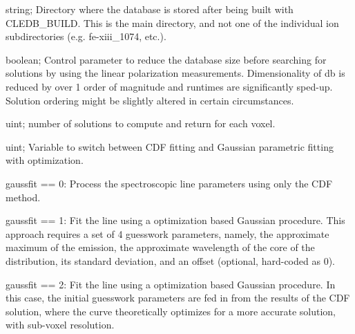 \documentclass{article}
\begin{document}
\begin{description}
    [font=\normalfont,leftmargin=1.3in,style=multiline]
	\item[dbdir]
	string; Directory where the database is stored after being built with CLEDB\_BUILD. This is the main directory, and not one of the individual ion subdirectories (e.g. fe-xiii\_1074, etc.).
	\item[reduced]
	boolean; Control parameter to reduce the database size before searching for solutions by using the linear polarization measurements. Dimensionality of db is reduced by over 1 order of magnitude and runtimes are significantly sped-up. Solution ordering might be slightly altered in certain circumstances.
	\item[nsearch]
	uint; number of solutions to compute and return for each voxel. 
	\item[gaussfit]
	uint; Variable to switch between CDF fitting and Gaussian parametric fitting with optimization.
	\item[]
	gaussfit == 0: Process the spectroscopic line parameters using only the CDF method.
	\item[]
	gaussfit == 1: Fit the line using a optimization based Gaussian procedure. This approach requires a set of 4 guesswork parameters, namely, the approximate maximum of the emission, the approximate wavelength of the core of the distribution, its standard deviation, and an offset (optional, hard-coded as 0).
	\item[]
	gaussfit == 2: Fit the line using a optimization based Gaussian procedure. In this case, the initial guesswork parameters are fed in from the results of the CDF solution, where the curve theoretically optimizes for a more accurate solution, with sub-voxel resolution.	
	

\end{description}
\end{document}
